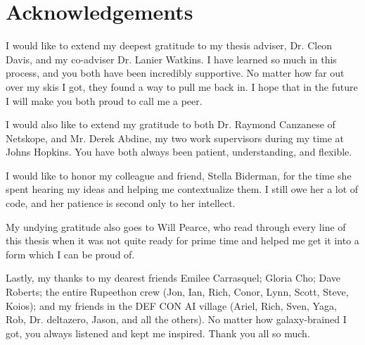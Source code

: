 \chapter*{Acknowledgements}

I would like to extend my deepest gratitude to my thesis adviser, Dr. Cleon Davis, and my co-adviser Dr. Lanier Watkins.
I have learned so much in this process, and you both have been incredibly supportive. 
No matter how far out over my skis I got, they found a way to pull me back in.
I hope that in the future I will make you both proud to call me a peer.

I would also like to extend my gratitude to both Dr. Raymond Canzanese of Netskope, and Mr. Derek Abdine, my two work supervisors during my time at Johns Hopkins.
You have both always been patient, understanding, and flexible.

I would like to honor my colleague and friend, Stella Biderman, for the time she spent hearing my ideas and helping me contextualize them. 
I still owe her a lot of code, and her patience is second only to her intellect.

My undying gratitude also goes to Will Pearce, who read through every line of this thesis when it was not quite ready for prime time and helped me get it into a form which I can be proud of.

Lastly, my thanks to my dearest friends Emilee Carrasquel; Gloria Cho; Dave Roberts; the entire Rupeethon crew (Jon, Ian, Rich, Conor, Lynn, Scott, Steve, Koios); and my friends in the DEF CON AI village (Ariel, Rich, Sven, Yaga, Rob, Dr. deltazero, Jason, and all the others). 
No matter how galaxy-brained I got, you always listened and kept me inspired.
Thank you all so much.